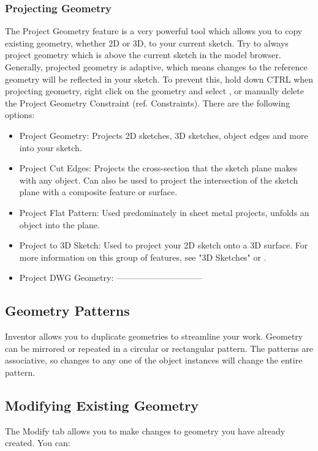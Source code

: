 \subsubsection{Projecting Geometry}
The Project Geometry feature is a very powerful tool which allows you to copy existing geometry, whether 2D or 3D, to your current sketch. Try to always project geometry which is above the current sketch in the model browser. Generally, projected geometry is adaptive, which means changes to the reference geometry will be reflected in your sketch. To prevent this, hold down CTRL when projecting geometry, right click on the geometry and select , or manually delete the Project Geometry Constraint (ref. Constraints). There are the following options:

\begin{itemize}
\item Project Geometry: Projects 2D sketches, 3D sketches, object edges and more into your sketch.
\item Project Cut Edges: Projects the cross-section that the sketch plane makes with any object. Can also be used to project the intersection of the sketch plane with a composite feature or surface.
\item Project Flat Pattern: Used predominately in sheet metal projects, unfolds an object into the plane.
\item Project to 3D Sketch: Used to project your 2D sketch onto a 3D surface. For more information on this group of features, see "3D Sketches" or .
\item Project DWG Geometry:  ------------------------------
\end{itemize}

\subsection{Geometry Patterns}
Inventor allows you to duplicate geometries to streamline your work. Geometry can be mirrored or repeated in a circular or rectangular pattern. The patterns are associative, so changes to any one of the object instances will change the entire pattern.

\subsection{Modifying Existing Geometry}
The Modify tab allows you to make changes to geometry you have already created. You can:

